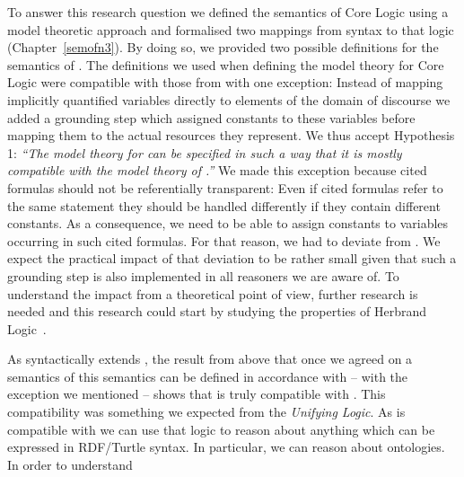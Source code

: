 To answer this research question we defined the semantics of  \nthree Core Logic using a model theoretic approach  and formalised two mappings 
from \nthree syntax to that logic (Chapter~\ref{semofn3}). By doing so, we provided two possible definitions for the semantics of \nthree.
The definitions we used when defining the model theory for \nthree Core Logic were compatible with those from \rdf with one exception:
Instead of mapping implicitly quantified variables directly to elements of the domain of discourse we added a grounding step which assigned 
\nthree constants to these variables before mapping them to the actual resources they represent.
We thus accept Hypothesis 1: \emph{``The model theory for \nthreelogic can be specified in such a way that it is mostly compatible with the model theory of \rdf.''}
We made this exception because
cited  \nthree formulas should not be referentially transparent: Even if cited formulas refer to the same statement they should be
handled differently if they contain different constants. As a consequence, we need to be able to assign constants to variables occurring in such cited formulas.
For that reason, we had to deviate from \rdf. We expect the practical impact of that deviation to be rather small given that such a grounding step is also implemented in all 
\nthree reasoners we are aware of. To understand the impact from a theoretical point of view, further research is needed and this research could start by studying the properties of 
Herbrand Logic~\cite{herbrandLogic}.
% 

As \nthree syntactically extends \rdf, the result from above that once we agreed on a semantics of \nthree this semantics can be defined in accordance 
with \rdf{} -- with the exception we mentioned -- shows that \nthree is truly compatible with \rdf. This compatibility was something we expected from the \emph{Unifying Logic}.
As \nthree is compatible with \rdf we can use that logic to reason about anything which can be expressed in RDF/Turtle syntax. In particular, we can reason about \owl ontologies. 
In order to understand 



